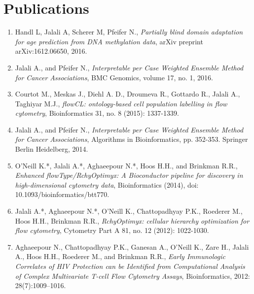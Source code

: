 \documentclass[11pt,a4paper,sans]{moderncv} %
\begin{document}
\renewcommand{\listitemsymbol}{-~} %


\section{Publications}

\begin{enumerate}
\item Handl L, Jalali A, Scherer M, Pfeifer N., \emph{Partially blind domain adaptation for age prediction from DNA methylation data}, arXiv preprint arXiv:1612.06650, 2016.
  
\item Jalali A., and Pfeifer N., \emph{Interpretable per Case Weighted Ensemble Method for Cancer Associations}, BMC Genomics, volume 17, no. 1, 2016.

\item Courtot M., Meskas J., Diehl A. D., Droumeva R., Gottardo R., Jalali A., Taghiyar M.J., \emph{flowCL: ontology-based cell population labelling in flow cytometry}, Bioinformatics 31, no. 8 (2015): 1337-1339.

\item Jalali A., and Pfeifer N., \emph{Interpretable per Case Weighted Ensemble Method for Cancer Associations}, Algorithms in Bioinformatics, pp. 352-353. Springer Berlin Heidelberg, 2014.

\item O'Neill K.*, Jalali A.*, Aghaeepour N.*, Hoos H.H., and Brinkman R.R., \emph{Enhanced flowType/RchyOptimyx: A Bioconductor pipeline for discovery in high-dimensional cytometry data}, Bioinformatics (2014), doi: 10.1093/bioinformatics/btt770.

\item Jalali A.*, Aghaeepour N.*, O'Neill K., Chattopadhyay P.K., Roederer M., Hoos H.H., Brinkman R.R., \emph{RchyOptimyx: cellular hierarchy optimization for flow cytometry}, Cytometry Part A 81, no. 12 (2012): 1022-1030.

\item Aghaeepour N., Chattopadhyay P.K., Ganesan A., O'Neill K., Zare H., Jalali A., Hoos H.H., Roederer M., and Brinkman R.R., \emph{Early Immunologic Correlates of HIV Protection can be Identiﬁed from Computational Analysis of Complex Multivariate T-cell Flow Cytometry Assays},
Bioinformatics, 2012: 28(7):1009–1016.



\end{enumerate}
\end{document}
